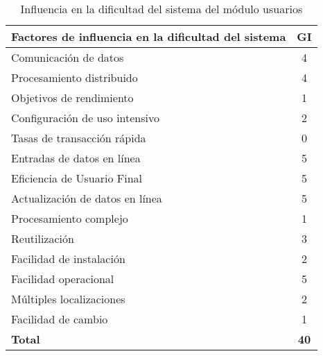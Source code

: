 \documentclass[11pt,a4paper,spanish,twoside]{book}
\begin{document}
\begin{table}[!ht]
  \centering
  \begin{tabular}{|l|c|}
    \hline
    \textbf{Factores de influencia en la dificultad del sistema} & 
    \textbf{GI} \\
    \hline \hline
    Comunicación de datos           & 4 \\ \hline
    Procesamiento distribuido       & 4 \\ \hline
    Objetivos de rendimiento        & 1 \\ \hline
    Configuración de uso intensivo  & 2 \\ \hline
    Tasas de transacción rápida     & 0 \\ \hline
    Entradas de datos en línea      & 5 \\ \hline
    Eficiencia de Usuario Final     & 5 \\ \hline
    Actualización de datos en línea & 5 \\ \hline
    Procesamiento complejo          & 1 \\ \hline
    Reutilización                   & 3 \\ \hline
    Facilidad de instalación        & 2 \\ \hline
    Facilidad operacional           & 5 \\ \hline
    Múltiples localizaciones        & 2 \\ \hline
    Facilidad de cambio             & 1 \\ \hline \hline
    \textbf{Total}                  & \textbf{40} \\ \hline
  \end{tabular}
  \label{tab:infUS}
  \caption{Influencia en la dificultad del sistema del módulo usuarios}
\end{table}
\end{document}
